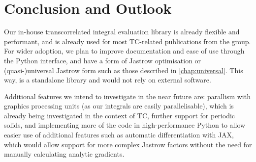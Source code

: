 \section{Conclusion and Outlook}

Our in-house transcorrelated integral evaluation library is already flexible and performant, and is already used for most TC-related publications from the group. For wider adoption, we plan to improve documentation and ease of use through the Python interface, and have a form of Jastrow optimisation or (quasi-)universal Jastrow form such as those described in \autoref{chap:universal}. This way, \pytchint is a standalone library and would not rely on external software.

Additional features we intend to investigate in the near future are: parallism with graphics processing units (as our integrals are easily parallelisable), which is already being investigated in the context of TC, further support for periodic solids, and implementing more of the code in high-performance Python to allow easier use of additional features such as automatic differentiation\supercite{wengertSimple1964} with JAX,\supercite{jax2018github} which would allow support for more complex Jastrow factors without the need for manually calculating analytic gradients.
